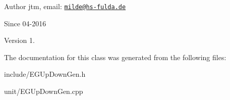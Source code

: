 \begin{DoxyAuthor}{Author}
jtm, email\+:  \href{mailto:milde@hs-fulda.de}{\tt milde@hs-\/fulda.\+de} 
\end{DoxyAuthor}
\begin{DoxySince}{Since}
04-\/2016 
\end{DoxySince}
\begin{DoxyVersion}{Version}
1. 
\end{DoxyVersion}


The documentation for this class was generated from the following files\+:\begin{DoxyCompactItemize}
\item 
include/E\+G\+Up\+Down\+Gen.\+h\item 
unit/E\+G\+Up\+Down\+Gen.\+cpp\end{DoxyCompactItemize}
